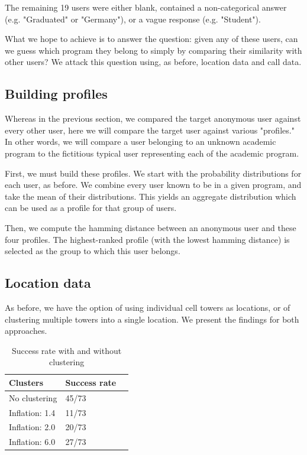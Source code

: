 \documentclass[pageno]{jpaper}
\begin{document}
The remaining 19 users were either blank, contained a non-categorical answer (e.g. "Graduated" or "Germany"), or a vague response (e.g. "Student"). 

What we hope to achieve is to answer the question: given any of these users, can we guess which program they belong to simply by comparing their similarity with other users? We attack this question using, as before, location data and call data. 

\subsection{Building profiles}

Whereas in the previous section, we compared the target anonymous user against every other user, here we will compare the target user against various "profiles." In other words, we will compare a user belonging to an unknown academic program to the fictitious typical user representing each of the academic program. 

First, we must build these profiles. We start with the probability distributions for each user, as before. We combine every user known to be in a given program, and take the mean of their distributions. This yields an aggregate distribution which can be used as a profile for that group of users.

Then, we compute the hamming distance between an anonymous user and these four profiles. The highest-ranked profile (with the lowest hamming distance) is selected as the group to which this user belongs. 

\subsection{Location data}

As before, we have the option of using individual cell towers as locations, or of clustering multiple towers into a single location. We present the findings for both approaches. 

\begin{table}[h!]
  \centering
  \begin{tabular}{|l|l|l|}
    \hline
    \textbf{Clusters} & \textbf{Success rate}\\
    \hline
    \hline
    No clustering &  45/73\\
    \hline
    Inflation: 1.4 & 11/73\\
    \hline
    Inflation: 2.0 &  20/73\\
    \hline
    Inflation: 6.0 &  27/73\\
    \hline
  \end{tabular}
  \caption{Success rate with and without clustering}
  \label{table:formatting}
\end{table}
\end{document}
